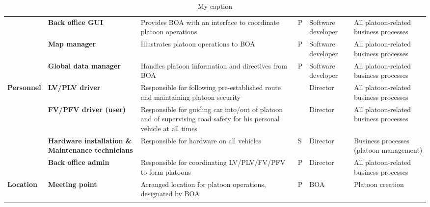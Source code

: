 \documentclass[british,11pt,a4paper]{article}
\begin{document}
\begin{longtable}{|p{2cm}|p{2cm}|p{5cm}|p{1cm}|p{2cm}|p{2.5cm}|}
 & \textbf{Back office GUI} & Provides BOA with an interface to coordinate platoon operations & P & Software developer & All platoon-related business processes \\ \cline{2-6} 
 & \textbf{Map manager} & Illustrates platoon operations to BOA & P & Software developer & All platoon-related business processes \\ \cline{2-6} 
 & \textbf{Global data manager} & Handles platoon information and directives from BOA & P & Software developer & All platoon-related business processes \\ \hline
\multirow{4}{2cm}{\textbf{Personnel}} & \textbf{LV/PLV driver} & Responsible for following pre-established route and maintaining platoon security &  & Director & All platoon-related business processes \\ \cline{2-6} 
 & \textbf{FV/PFV driver (user)} & Responsible for guiding car into/out of platoon and of supervising road safety for his personal vehicle at all times &  & Director & All platoon-related business processes \\ \cline{2-6} 
 & \textbf{Hardware installation \& Maintenance technicians} & Responsible for hardware on all vehicles & S & Director & Business processes (platoon management) \\ \cline{2-6} 
 & \textbf{Back office admin} & Responsible for coordinating LV/PLV/FV/PFV to form platoons & P & Director & All platoon-related business processes \\ \hline
\textbf{Location} & \textbf{Meeting point} & Arranged location for platoon operations, designated by BOA & P & BOA & Platoon creation \\ \hline
\caption{My caption}
\label{my-label}
\end{longtable}
\end{document}

